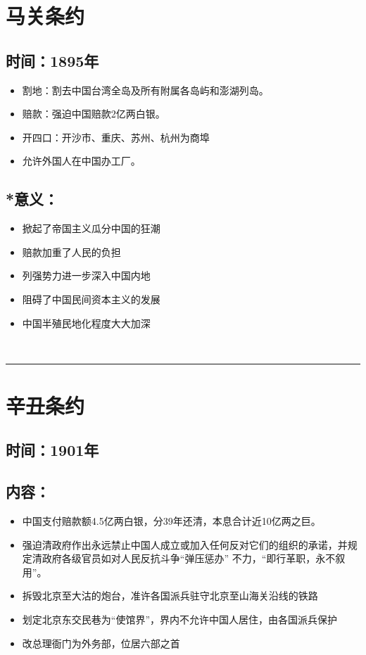 \documentclass{article}
\begin{document}
\section*{马关条约}
\subsection*{时间：1895年}
\begin{itemize}
    \item 割地：割去中国台湾全岛及所有附属各岛屿和澎湖列岛。
    \item 赔款：强迫中国赔款2亿两白银。
    \item 开四口：开沙市、重庆、苏州、杭州为商埠
    \item 允许外国人在中国办工厂。
\end{itemize}
\subsection*{*意义：}
\begin{itemize}
\item 掀起了帝国主义瓜分中国的狂潮
\item 赔款加重了人民的负担
\item 列强势力进一步深入中国内地
\item 阻碍了中国民间资本主义的发展
\item 中国半殖民地化程度大大加深
\end{itemize}
\ \hrule

\section*{辛丑条约}
\subsection*{时间：1901年}
\subsection*{内容：}
\begin{itemize}
    \item 中国支付赔款额4.5亿两白银，分39年还清，本息合计近10亿两之巨。
    \item 强迫清政府作出永远禁止中国人成立或加入任何反对它们的组织的承诺，并规定清政府各级官员如对人民反抗斗争“弹压惩办” 不力，“即行革职，永不叙用”。
    \item 拆毁北京至大沽的炮台，准许各国派兵驻守北京至山海关沿线的铁路
    \item 划定北京东交民巷为“使馆界”，界内不允许中国人居住，由各国派兵保护
    \item 改总理衙门为外务部，位居六部之首
\end{itemize}
\end{document}
